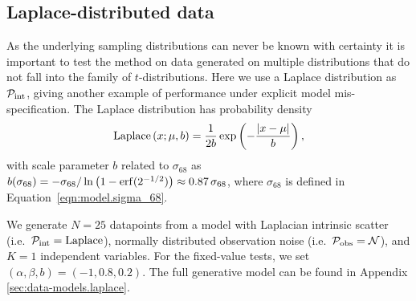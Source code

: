 \documentclass[fleqn,usenatbib]{rasti}
\begin{document}

\subsection{Laplace-distributed data}
\label{sec:results.laplace}

As the underlying sampling distributions can never be known with certainty it is
important to test the method on data generated on multiple distributions that do
not fall into the family of $t$-distributions. Here we use a Laplace
distribution as $\mathcal P_{\rm int}$, giving another example of performance
under explicit model mis-specification. The Laplace distribution has probability
density
\begin{equation}
    {\rm Laplace}\left(x; \mu, b\right) = \frac1{2b} \exp\left(-\frac{\left|x - \mu\right|}{b}\right),
\end{equation}
with scale parameter $b$ related to $\sigma_{68}$ as $b(\sigma_{68}) =
- \sigma_{68} / \ln \left( 1 - {\rm erf} (2^{-1/2})\right) \approx 0.87\,
\sigma_{68}$, where $\sigma_{68}$ is defined in
Equation~\ref{eqn:model.sigma_68}.

We generate $N = 25$ datapoints from a model with Laplacian intrinsic scatter
(i.e.\ $\mathcal P_{\rm int} = \mathrm{Laplace}$), normally distributed
observation noise (i.e.\ $\mathcal P_{\rm obs} = \mathcal N$), and $K = 1$
independent variables. For the fixed-value tests, we set $(\alpha, \beta, b) =
(-1, 0.8, 0.2)$. The full generative model can be found in Appendix
\ref{sec:data-models.laplace}.
\end{document}
